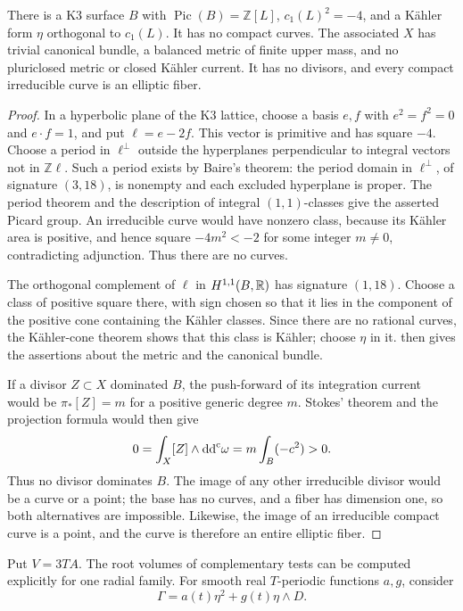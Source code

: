 \begin{example}\label{ex:primitive-elliptic-k3}
There is a K3 surface $B$ with $\operatorname{Pic}(B)=\mathbb Z[L]$, $c_1(L)^2=-4$, and a K\"ahler form $\eta$ orthogonal to $c_1(L)$. It has no compact curves. The associated $X$ has trivial canonical bundle, a balanced metric of finite upper mass, and no pluriclosed metric or closed K\"ahler current. It has no divisors, and every compact irreducible curve is an elliptic fiber.
\end{example}
\begin{proof}
In a hyperbolic plane of the K3 lattice, choose a basis $e,f$ with $e^2=f^2=0$ and $e\cdot f=1$, and put $\ell=e-2f$. This vector is primitive and has square $-4$. Choose a period in $\ell^\perp$ outside the hyperplanes perpendicular to integral vectors not in $\mathbb Z\ell$. Such a period exists by Baire's theorem: the period domain in $\ell^\perp$, of signature $(3,18)$, is nonempty and each excluded hyperplane is proper. The period theorem and the description of integral $(1,1)$-classes give the asserted Picard group. An irreducible curve would have nonzero class, because its K\"ahler area is positive, and hence square $-4m^2<-2$ for some integer $m\neq0$, contradicting adjunction. Thus there are no curves.

The orthogonal complement of $\ell$ in $H^{1,1}(B,\mathbb R)$ has signature $(1,18)$. Choose a class of positive square there, with sign chosen so that it lies in the component of the positive cone containing the K\"ahler classes. Since there are no rational curves, the K\"ahler-cone theorem shows that this class is K\"ahler; choose $\eta$ in it.  then gives the assertions about the metric and the canonical bundle.

If a divisor $Z\subset X$ dominated $B$, the push-forward of its integration current would be $\pi_*[Z]=m$ for a positive generic degree $m$. Stokes' theorem and the projection formula would then give
\[
 0=\int_X[Z]\wedge\mathrm{dd}^{\mathrm{c}}\omega
   =m\int_B(-c^2)>0.
\]
Thus no divisor dominates $B$. The image of any other irreducible divisor would be a curve or a point; the base has no curves, and a fiber has dimension one, so both alternatives are impossible. Likewise, the image of an irreducible compact curve is a point, and the curve is therefore an entire elliptic fiber.
\end{proof}

Put $V=3TA$. The root volumes of complementary tests can be computed explicitly for one radial family. For smooth real $T$-periodic functions $a,g$, consider
\[
 \Gamma=a(t)\eta^2+g(t)\eta\wedge D.
\]

